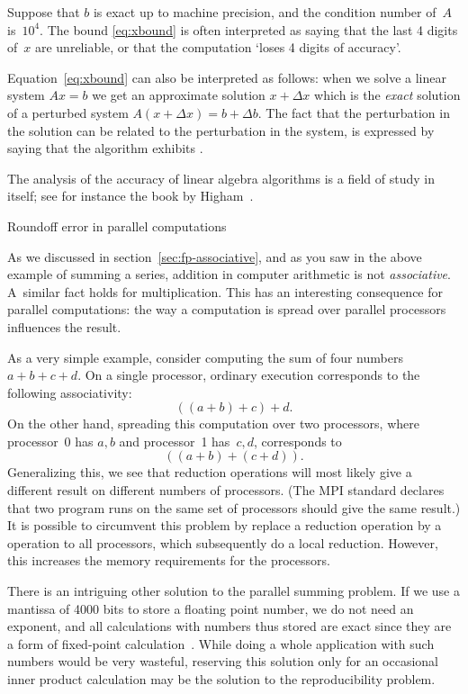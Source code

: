 Suppose that $b$ is exact up to machine precision, and the
condition number of~$A$ is~$10^4$. The bound \eqref{eq:xbound} is
often interpreted as saying that the last 4 digits of~$x$ are
unreliable, or that the computation `loses 4 digits of accuracy'.

Equation~\eqref{eq:xbound} can also be interpreted as follows: when we
solve a linear system $Ax=b$ we get an approximate solution $x+\Delta
x$ which is the \emph{exact} solution of a perturbed system
$A(x+\Delta x)=b+\Delta b$. The fact that the perturbation in the
solution can be related to the perturbation in the system, is
expressed by saying that the algorithm exhibits .

The analysis of the accuracy of linear algebra algorithms is a field
of study in itself; see for instance the book by
Higham~\cite{Higham:2002:ASN}.

 {Roundoff error in parallel computations}
\label{sec:roundoff-parallel}

As we discussed in section~\ref{sec:fp-associative}, and as you saw
in the above example of summing a series, addition in
computer arithmetic is not \emph{associative}. A~similar fact holds for
multiplication.  This has an interesting consequence for parallel
computations: the way a computation is spread over parallel processors
influences the result. 

As a very simple example, consider computing the sum of four numbers $a+b+c+d$.
On a single processor, ordinary execution corresponds to the following associativity:
\[ ((a+b)+c)+d. \]
On the other hand, spreading this computation over two processors, 
where processor~0 has $a,b$ and processor~1 has~$c,d$,
corresponds to
\[ ((a+b)+(c+d)). \]
Generalizing this, we see that reduction operations will most likely
give a different result on different numbers of processors. (The MPI
standard declares that two program runs on the same set of processors
should give the same result.)
It is possible to circumvent this problem by replace a reduction operation
by a  operation to all processors, which subsequently 
do a local reduction. However, this increases the memory requirements for the 
processors.

There is an intriguing other solution to the parallel summing problem.
If we use a mantissa of 4000 bits to store a floating point number, we
do not need an exponent, and all calculations with numbers thus stored
are exact since they are a form of fixed-point
calculation~\cite{Kulish:dotproduct,Kulisch:2011:VFE}.  While doing a
whole application with such numbers would be very wasteful, reserving
this solution only for an occasional inner product calculation may be
the solution to the reproducibility problem.

